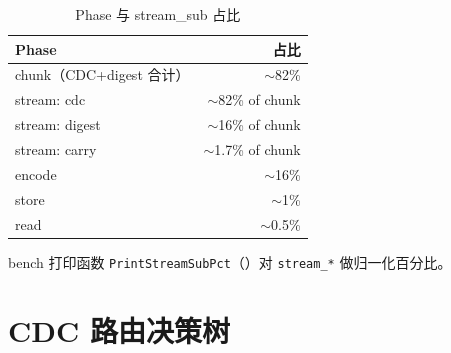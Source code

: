 \begin{table}[htbp]
\centering
\caption{Phase 与 stream\_sub 占比}
\begin{tabular}{@{}lr@{}}
\toprule
Phase & 占比 \\
\midrule
chunk（CDC+digest 合计） & $\sim$82\% \\
\quad stream: cdc & $\sim$82\% of chunk \\
\quad stream: digest & $\sim$16\% of chunk \\
\quad stream: carry & $\sim$1.7\% of chunk \\
encode & $\sim$16\% \\
store & $\sim$1\% \\
read & $\sim$0.5\% \\
\bottomrule
\end{tabular}
\end{table}

bench 打印函数 \texttt{PrintStreamSubPct}（）对 \texttt{stream\_*} 做归一化百分比。

\section{CDC 路由决策树}

